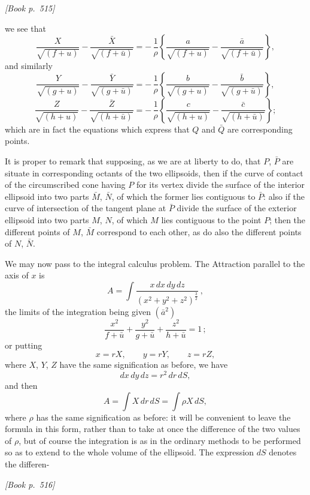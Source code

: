 \documentclass[11pt]{article}
\begin{document}
\medskip
\noindent\textit{[Book p.~515]}\hfill

\smallskip

\noindent we see that
\[
\frac{X}{\sqrt{(f + u)}} - \frac{\bar{X}}{\sqrt{(f + \bar{u})}} = -\,\frac{1}{\rho}\!\left\{\frac{a}{\sqrt{(f + u)}} - \frac{\bar{a}}{\sqrt{(f + \bar{u})}}\right\},
\]
and similarly
\[
\frac{Y}{\sqrt{(g + u)}} - \frac{\bar{Y}}{\sqrt{(g + \bar{u})}} = -\,\frac{1}{\rho}\!\left\{\frac{b}{\sqrt{(g + u)}} - \frac{\bar{b}}{\sqrt{(g + \bar{u})}}\right\},
\]
\[
\frac{Z}{\sqrt{(h + u)}} - \frac{\bar{Z}}{\sqrt{(h + \bar{u})}} = -\,\frac{1}{\rho}\!\left\{\frac{c}{\sqrt{(h + u)}} - \frac{\bar{c}}{\sqrt{(h + \bar{u})}}\right\};
\]
which are in fact the equations which express that $Q$ and $\bar{Q}$ are corresponding points.

\medskip

It is proper to remark that supposing, as we are at liberty to do, that $P$, $\bar{P}$ are situate in corresponding octants of the two ellipsoids, then if the curve of contact of the circumscribed cone having $P$ for its vertex divide the surface of the interior ellipsoid into two parts $\bar{M}$, $\bar{N}$, of which the former lies contiguous to $\bar{P}$: also if the curve of intersection of the tangent plane at $\bar{P}$ divide the surface of the exterior ellipsoid into two parts $M$, $N$, of which $M$ lies contiguous to the point $P$; then the different points of $M$, $\bar{M}$ correspond to each other, as do also the different points of $N$, $\bar{N}$.

\medskip

We may now pass to the integral calculus problem. The Attraction parallel to the axis of $x$ is
\[
A = \int \frac{x\, dx\, dy\, dz}{(x^{2} + y^{2} + z^{2})^{\frac{3}{2}}}\,,
\]
the limits of the integration being given $(\bar{a}^{2})$
\[
\frac{x^{2}}{f + \bar{u}} + \frac{y^{2}}{g + \bar{u}} + \frac{z^{2}}{h + \bar{u}} = 1\,;
\]
or putting
\[
x = r X,\qquad y = r Y,\qquad z = r Z,
\]
where $X$, $Y$, $Z$ have the same signification as before, we have
\[
dx\, dy\, dz = r^{2}\, dr\, dS,
\]
and then
\[
A = \int X\, dr\, dS = \int \rho X\, dS,
\]
where $\rho$ has the same signification as before: it will be convenient to leave the formula in this form, rather than to take at once the difference of the two values of $\rho$, but of course the integration is as in the ordinary methods to be performed so as to extend to the whole volume of the ellipsoid. The expression $dS$ denotes the differen-

\medskip
\noindent\textit{[Book p.~516]}\hfill
\end{document}
